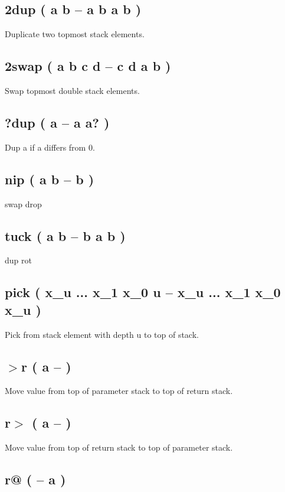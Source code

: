 \subsection{2dup ( a b -- a b a b )}

Duplicate two topmost stack elements.

\subsection{2swap ( a b c d -- c d a b )}

Swap topmost double stack elements.

\subsection{?dup ( a -- a a? )}

Dup a if a differs from 0.

\subsection{nip ( a b -- b )}

swap drop

\subsection{tuck ( a b -- b a b )}

dup rot

\subsection{pick ( x\_u ... x\_1 x\_0 u -- x\_u ... x\_1 x\_0 x\_u )}

Pick from stack element with depth u to top of stack.

\subsection{$>$r ( a -- )}

Move value from top of parameter stack to top of return stack. 

\subsection{r$>$ ( a -- )}

Move value from top of return stack to top of parameter stack. 

\subsection{r@ ( -- a )}

